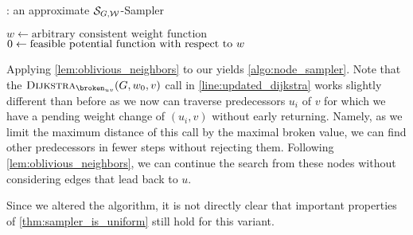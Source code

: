 \begin{algorithm}[!htb]
  \caption{
    \algns: an approximate $\mathcal{S}_{G, \mathcal W}$-Sampler  
  }
  \label{algo:node_sampler}


  \BlankLine
  $w \gets \text{arbitrary consistent weight function}$\;
  $\pot \gets \text{feasible potential function with respect to $w$}$\;
  \RepTimes{\steps}{
    $v \follows \unif(V)$\;
    $c \follows \unif(\wInt^{\degin(v)})$\;
    $w' \gets w_{(u_1,v) \gets c_1, (u_2,v) \gets c_2, \ldots}$\;
    $\brokuv \gets \max\setc{-\wpot'(u_i,v)}{i \in [\degin(v)]}$\;
    
    \BlankLine
    $T \gets \algdk_{\brokuv}(G, \wpot, v)$\label{line:updated_dijkstra}\;
    \For{$i \in [\degin(v)$}{
        \If{$T[u_i] \geq -\wpot'(u_i,v)$}{
            $w \gets \weightUp{(u_i,v)}{c_i}$\;
        }
    }
    \If{at least one \emph{accepted}}{
        $\pot(x) \gets \pot(x) + \brokuv - T[x] \quad \forall x \in T$\;
    } 
  }
  \;
\end{algorithm}

Applying \cref{lem:oblivious_neighbors} to our \markov yields \cref{algo:node_sampler}.
Note that the $\algdk_{\brokuv}(G, \wpot, v)$ call in \cref{line:updated_dijkstra} works slightly different than before as we now can traverse predecessors $u_i$ of $v$ for which we have a pending weight change of $(u_i,v)$ without early returning.
Namely, as we limit the maximum distance of this \algdk call by the maximal broken value, we can find other predecessors in fewer steps without rejecting them.
Following \cref{lem:oblivious_neighbors}, we can continue the search from these nodes without considering edges that lead back to $u$.

\medskip

Since we altered the algorithm, it is not directly clear that important properties of \cref{thm:sampler_is_uniform} still hold for this variant.

